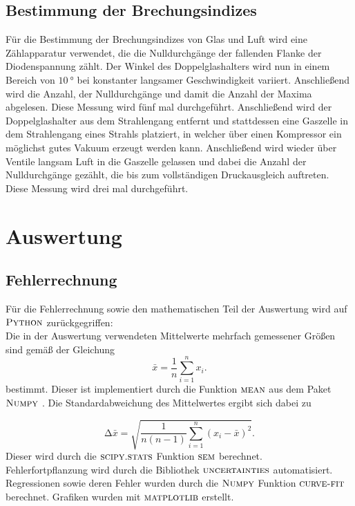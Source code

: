 \documentclass[
  bibliography=totoc,     %
  captions=tableheading,  %
  titlepage=firstiscover, %
]{scrartcl}
\begin{document}
\subsection{Bestimmung der Brechungsindizes}
\label{sub:brechindizes}
Für die Bestimmung der Brechungsindizes von Glas und Luft wird eine Zählapparatur
verwendet, die die Nulldurchgänge der fallenden Flanke der Diodenspannung zählt.
Der Winkel des Doppelglashalters wird nun in einem Bereich von $\SI{10}{\degree}$
bei konstanter langsamer Geschwindigkeit variiert. Anschließend wird die Anzahl,
der Nulldurchgänge und damit die Anzahl der Maxima abgelesen.
Diese Messung wird fünf mal durchgeführt.
Anschließend wird der Doppelglashalter aus dem Strahlengang entfernt und stattdessen
eine Gaszelle in dem Strahlengang eines Strahls platziert, in welcher über einen
Kompressor ein möglichst gutes Vakuum erzeugt werden kann. Anschließend wird
wieder über Ventile langsam Luft in die Gaszelle gelassen und dabei die Anzahl
der Nulldurchgänge gezählt, die bis zum vollständigen Druckausgleich auftreten.
Diese Messung wird drei mal durchgeführt.

\section{Auswertung}
\label{sec:auswertung}

\subsection{Fehlerrechnung}
\label{sec:fehlerrechnung}
Für die Fehlerrechnung sowie den mathematischen Teil der Auswertung wird auf
  $\textsc{Python}$ \cite{python} zurückgegriffen:\\
Die in der Auswertung verwendeten Mittelwerte mehrfach gemessener Größen sind
gemäß der Gleichung
\begin{equation}
    \bar{x}=\frac{1}{n}\sum_{i=1}^n x_i.
    \label{eq:mittelwert}
\end{equation}
\noindent
bestimmt. Dieser ist implementiert durch die Funktion $\textsc{mean}$ aus dem Paket
  $\textsc{Numpy}$ \cite{numpy}. Die Standardabweichung des Mittelwertes ergibt sich dabei zu

\begin{equation}
    \mathup{\Delta}\bar{x}=\sqrt{\frac{1}{n(n-1)}\sum_{i=1}^n\left(x_i-\bar{x}\right)^2}.
    \label{eq:standardabweichung}
\end{equation}
\noindent
Dieser wird durch die
$\textsc{scipy.stats}$ \cite{scipy} Funktion $\textsc{sem}$ berechnet.\\
Fehlerfortpflanzung wird
durch die Bibliothek $\textsc{uncertainties}$ \cite{uncertainties} automatisiert.
Regressionen sowie deren Fehler wurden durch die $\textsc{Numpy}$
Funktion $\textsc{curve-fit}$ berechnet.
Grafiken wurden mit $\textsc{matplotlib}$ \cite{matplotlib}
erstellt.
\end{document}
